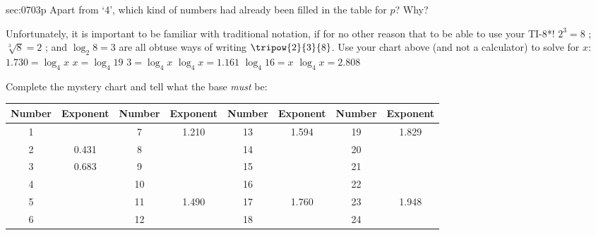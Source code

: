 \begin{exercises}{sec:0703p}
\lab Apart from `4', which kind of numbers had already been filled in the table for $p$?  Why?
\vspace{2cm}
\begin{multicols}{2}
\lab{} Unfortunately, it is important to be familiar with traditional notation, if for no other reason that to be able to use your TI-8*!  $2^3=8$ ; $\sqrt[3]{8}=2$ ; and $\log_2{8}=3$ are all obtuse ways of writing $\tripow{2}{3}{8}$.  Use your chart above (and not a calculator) to solve for $x$:
\subprob $1.730 = \log_4{x}$
\vspace{5mm}
\subprob $x = \log_4{19}$
\vspace{5mm}
\subprob $3 = \log_4{x}$
\vspace{5mm}
\subprob $\log_4{x} = 1.161$
\vspace{5mm}
\subprob $\log_4{16} = x$
\vspace{5mm}
\subprob $\log_4{x} = 2.808$
\vspace{5mm}
\end{multicols}

\lab{} Complete the mystery chart and tell what the base \emph{must} be:\\
\begin{tabular}{ c | c || c | c || c | c || c | c }
	\textbf{Number} & \textbf{Exponent} & \textbf{Number} & \textbf{Exponent} & \textbf{Number} & \textbf{Exponent} & \textbf{Number} & \textbf{Exponent} \\ \hline \hline
	1 & & 7 & 1.210 & 13 & 1.594 & 19 & 1.829 \\ \hline
	2 & 0.431 & 8 & & 14 & & 20 & \\ \hline
	3 & 0.683 & 9 & & 15 & & 21 & \\ \hline
	4 &  & 10 & & 16 & & 22 & \\ \hline
	5 &  & 11 & 1.490 & 17 & 1.760 & 23 & 1.948 \\ \hline
	6 & & 12 & & 18 & & 24 & \\ \hline
\end{tabular}


\end{exercises}